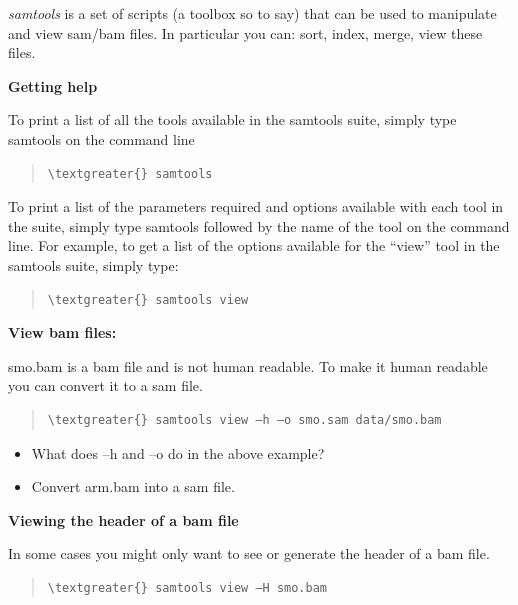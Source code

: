 \documentclass[letterpaper,10pt,english]{sphinxmanual}
\begin{document}
\emph{samtools} is a set of scripts (a toolbox so to say) that can be used to manipulate and view sam/bam files. In particular you can: sort, index, merge, view these files.

\textbf{Getting help}

To print a list of all the tools available in the samtools suite, simply type samtools on the command line
\begin{quote}

\begin{Verbatim}[commandchars=\\\{\}]
\textgreater{} samtools
\end{Verbatim}
\end{quote}

To print a list of the parameters required and options available with each tool in the suite, simply type samtools followed by the name of the tool on the command line. For example, to get a list of the options available for the “view” tool in the samtools suite, simply type:
\begin{quote}

\begin{Verbatim}[commandchars=\\\{\}]
\textgreater{} samtools view
\end{Verbatim}
\end{quote}

\textbf{View bam files:}

smo.bam is a bam file and is not human readable. To make it human readable you can convert it to a sam file.
\begin{quote}

\begin{Verbatim}[commandchars=\\\{\}]
\textgreater{} samtools view –h –o smo.sam data/smo.bam
\end{Verbatim}
\end{quote}
\begin{itemize}
\item {} 
What does –h and –o do in the above example?

\item {} 
Convert arm.bam into a sam file.

\end{itemize}

\textbf{Viewing the header of a bam file}

In some cases you might only want to see or generate the header of a bam file.
\begin{quote}

\begin{Verbatim}[commandchars=\\\{\}]
\textgreater{} samtools view –H smo.bam
\end{Verbatim}
\end{quote}
\end{document}
